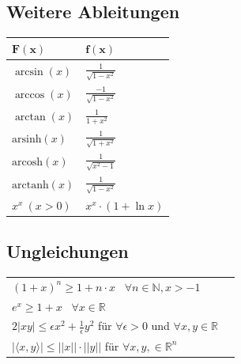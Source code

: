 \documentclass[a4paper,10pt]{article}
\begin{document}
\subsection{Weitere Ableitungen}
\begin{center}
  \begin{tabularx}{\linewidth}{>{\centering\arraybackslash}X>{\centering\arraybackslash}X}
  \toprule
  $\mathbf{F(x)}$ & $\mathbf{f(x)}$ \\
  \midrule
  $\arcsin(x)$ & $\frac{1}{\sqrt{1 - x^2}}$ \\
  $\arccos(x)$ & $\frac{-1}{\sqrt{1 - x^2}}$ \\
  $\arctan(x)$ & $\frac{1}{1 + x^2}$ \\ 
  $\text{arsinh}(x)$ & $\frac{1}{\sqrt{1 + x^2}}$ \\
  $\text{arcosh}(x)$ & $\frac{1}{\sqrt{x^2 - 1}}$ \\
  $\text{arctanh}(x)$ & $\frac{1}{\sqrt{1 - x^2}}$ \\
  $x^x \ (x > 0)$ & $x^x \cdot (1 + \ln x)$ \\
  \bottomrule
  \end{tabularx}
\end{center}

\subsection{Ungleichungen}
\begin{center}
  \begin{tabularx}{\linewidth}{>{\centering\arraybackslash}X>{\centering\arraybackslash}X}
    $(1+x)^n \geq 1+ n\cdot x$ \, $\forall n\in \mathbb{N}, x > -1$\\
    $e^x \geq 1 + x$ \, $\forall x\in \mathbb{R}$\\
    $2|xy| \leq \epsilon x^2 + \frac{1}{\epsilon} y^2$ für $\forall \epsilon > 0$ und $\forall x,y \in \mathbb{R}$\\
    $|\langle x,y \rangle| \leq ||x|| \cdot ||y||$ für $\forall x,y, \in \mathbb{R}^n$\\
  \end{tabularx}
\end{center}
\end{document}
